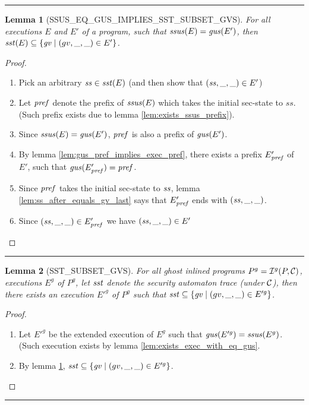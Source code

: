 \documentclass[a4paper,11pt]{article}
\newtheorem{lemma}{Lemma}
\newcommand{\sep}{\hspace{-1.5707965cm}\rule{\paperwidth}{1pt}}
\begin{document}
\sep

\begin{lemma}[SSUS\_EQ\_GUS\_IMPLIES\_SST\_SUBSET\_GVS]\label{lem:ssus_eq_gus_implies_sst_subset_gvs}
For all executions $E$ and $E'$ of a program, such that $\ssus(E) = \gus(E')$, then $\sst(E) \subseteq \{ \gv \mid (gv, \_, \_) \in E'\}$.
\end{lemma}

\begin{proof}
\begin{enumerate}
\item Pick an arbitrary $\ss \in \sst(E)$ (and then show that $(\ss, \_, \_) \in E'$)
\item Let $\pref$ denote the prefix of $\ssus(E)$ which takes the initial sec-state to $ss$. (Such prefix exists due to lemma \ref{lem:exists_ssus_prefix}).
\item Since $\ssus(E) = \gus(E')$, $\pref$ is also a prefix of $\gus(E')$.
\item By lemma \ref{lem:gus_pref_implies_exec_pref}, there exists a prefix $E'_\pref$ of $E'$, such that $\gus(E'_\pref) = \pref$.
\item Since $\pref$ takes the initial sec-state to $\ss$, lemma \ref{lem:ss_after_equals_gv_last} says that $E'_\pref$ ends with $(\ss, \_, \_)$.
\item Since $(\ss, \_, \_) \in E'_\pref$ we have $(\ss, \_, \_) \in E'$
\end{enumerate}
\end{proof}

\sep


\begin{lemma}[SST\_SUBSET\_GVS]
For all ghost inlined programs $P^g = {\cal I}^g(P, \cal C)$, executions $E^g$ of $P^g$, let $\sst$ denote the security automaton trace (under $\cal C$), then there exists an execution $E'^g$ of $P^g$ such that $\sst \subseteq \{ \gv \mid (gv, \_, \_) \in E'^g \}$.
\end{lemma}

\begin{proof}
\begin{enumerate}
\item Let $E'^g$ be the extended execution of $E^g$ such that $\gus(E'^g) = \ssus(E^g)$. (Such execution exists by lemma \ref{lem:exists_exec_with_eq_gus}.
\item By lemma \ref{lem:ssus_eq_gus_implies_sst_subset_gvs}, $\sst \subseteq \{ \gv \mid (gv, \_, \_) \in E'^g \}$.
\end{enumerate}
\end{proof}

\sep
\end{document}
